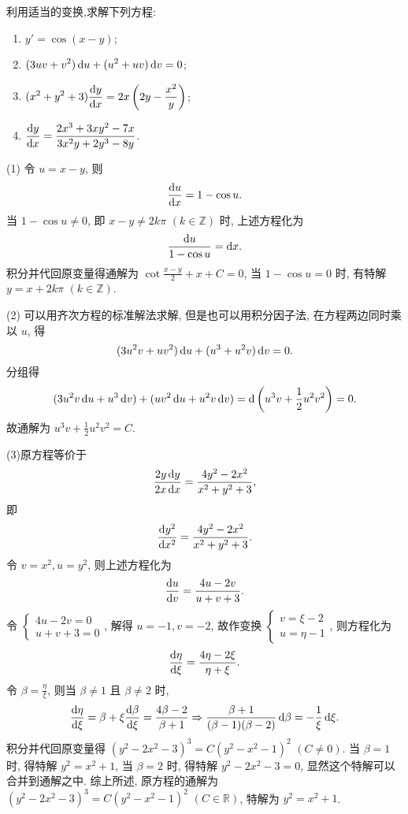 \begin{exercise}
  利用适当的变换,求解下列方程:
  \begin{enumerate}[(1)]
  \item $\displaystyle y'=\cos(x-y)$;
  \item $\displaystyle(3uv+v^2)\mathop{}\!\mathrm{d} u+(u^2+uv)\mathop{}\!\mathrm{d} v=0$;
  \item $\displaystyle(x^2+y^2+3)\frac{\mathop{}\!\mathrm{d} y}{\mathop{}\!\mathrm{d} x}=2x\left(2y-\frac{x^2}{y}\right)$;
  \item $\displaystyle\frac{\mathop{}\!\mathrm{d} y}{\mathop{}\!\mathrm{d} x}=\frac{2x^3+3xy^2-7x}{3x^2y+2y^3-8y}$.
  \end{enumerate}
\end{exercise}

\begin{solution}
  (1) 令 $u=x-y$, 则
  \[\frac{\mathop{}\!\mathrm{d} u}{\mathop{}\!\mathrm{d} x}=1-\cos u.\]
  当 $1-\cos u\neq 0$, 即 $x-y\neq 2k\pi$ $(k\in\mathbb{Z})$ 时, 上述方程化为
  \[\frac{\mathop{}\!\mathrm{d} u}{1-\cos u}=\mathop{}\!\mathrm{d} x.\]
  积分并代回原变量得通解为 $\cot\frac{x-y}{2}+x+C=0$, 当 $1-\cos u=0$ 时,
  有特解 $y=x+2k\pi$ $(k\in\mathbb{Z})$.

  (2) 可以用齐次方程的标准解法求解, 但是也可以用积分因子法, 在方程两边同时乘以 $u$, 得
  \[(3u^2v+uv^2)\mathop{}\!\mathrm{d} u+(u^3+u^2v)\mathop{}\!\mathrm{d} v=0.\]
  分组得
  \[(3u^2v\mathop{}\!\mathrm{d} u+u^3\mathop{}\!\mathrm{d} v)+(uv^2\mathop{}\!\mathrm{d} u+u^2v\mathop{}\!\mathrm{d} v)=\mathop{}\!\mathrm{d}\left(u^3v+\frac{1}{2}u^2v^2\right)=0.\]
  故通解为 $u^3v+\frac{1}{2}u^2v^2=C$.

  (3)原方程等价于
  \[\frac{2y\mathop{}\!\mathrm{d} y}{2x\mathop{}\!\mathrm{d} x} = \frac{4y^2-2x^2}{x^2+y^2+3},\]
  即
  \[\frac{\mathop{}\!\mathrm{d} y^2}{\mathop{}\!\mathrm{d} x^2} = \frac{4y^2-2x^2}{x^2+y^2+3}.\]
  令 $v=x^2,u=y^2$, 则上述方程化为
  \[\frac{\mathop{}\!\mathrm{d} u}{\mathop{}\!\mathrm{d} v}=\frac{4u-2v}{u+v+3}.\]
  令 $\begin{cases}4u-2v=0\\u+v+3=0\end{cases}$, 解得 $u=-1,v=-2$, 故作变换
  $\begin{cases}v=\xi-2\\u=\eta-1\end{cases}$, 则方程化为
  \[\frac{\mathop{}\!\mathrm{d}\eta}{\mathop{}\!\mathrm{d}\xi}=\frac{4\eta-2\xi}{\eta+\xi}.\]
  令 $\beta=\frac{\eta}{\xi}$, 则当 $\beta\neq 1$ 且 $\beta\neq 2$ 时,
  \[\frac{\mathop{}\!\mathrm{d}\eta}{\mathop{}\!\mathrm{d}\xi}=\beta+\xi\frac{\mathop{}\!\mathrm{d}\beta}{\mathop{}\!\mathrm{d}\xi}
    = \frac{4\beta-2}{\beta+1}
    \Rightarrow\frac{\beta+1}{(\beta-1)(\beta-2)}\mathop{}\!\mathrm{d}\beta=-\frac{1}{\xi}\mathop{}\!\mathrm{d}\xi.\]
  积分并代回原变量得 $\left(y^2-2x^2-3\right)^3 = C\left(y^2-x^2-1\right)^2$ $(C\neq 0)$.
  当 $\beta=1$ 时, 得特解 $y^2=x^2+1$, 当 $\beta=2$ 时, 
  得特解 $y^2-2x^2-3=0$, 显然这个特解可以合并到通解之中.
  综上所述, 原方程的通解为 $\left(y^2-2x^2-3\right)^3=C\left(y^2-x^2-1\right)^2$ $(C\in\mathbb{R})$,
  特解为 $y^2=x^2+1$.


\end{solution}
